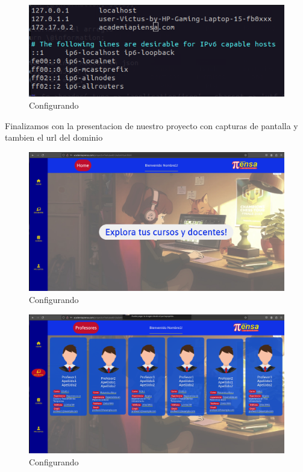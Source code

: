\begin{figure}[H]
  \centering
  \includegraphics[width=1.0\textwidth]{img/Conf_Maq_Local.png}
  \caption{Configurando}
\end{figure}

Finalizamos con la presentacion de nuestro proyecto con capturas de pantalla y tambien el url del dominio 
\begin{figure}[H]
  \centering
  \includegraphics[width=1.0\textwidth]{img/AulaVirtual.png}
  \caption{Configurando}
\end{figure}
\begin{figure}[H]
  \centering
  \includegraphics[width=1.0\textwidth]{img/AulaVirtual2.png}
  \caption{Configurando}
\end{figure}
